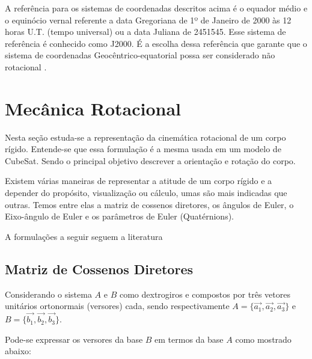 A referência para os sistemas de coordenadas descritos acima é o equador médio e o equinócio vernal referente a data Gregoriana de 1º de Janeiro de 2000 às 12 horas U.T. (tempo universal) ou a data Juliana de 2451545. Esse sistema de referência é conhecido como J2000. É a escolha dessa referência que garante que o sistema de coordenadas Geocêntrico-equatorial possa ser considerado não rotacional \cite{schutz2004statistical}.

\section{Mecânica Rotacional}\label{sec:3.1.2}

Nesta seção estuda-se a representação da cinemática rotacional de um corpo rígido. Entende-se que essa formulação é a mesma usada em um modelo de CubeSat. Sendo o principal objetivo descrever a orientação e rotação do corpo.

Existem várias maneiras de representar a atitude de um corpo rígido e a depender do propósito, visualização ou cálculo, umas são mais indicadas que outras. Temos entre elas a matriz de cossenos diretores, os ângulos de Euler, o Eixo-ângulo de Euler e os parâmetros de Euler (Quatérnions).

A formulações a seguir seguem a literatura \cite[p.~323-486]{wie2008space}

\subsection{Matriz de Cossenos Diretores}\label{sec:3.1.2.1}

Considerando o sistema \begin{math}A\end{math} e \begin{math}B\end{math} como dextrogiros e compostos por três vetores unitários ortonormais (versores) cada, sendo respectivamente \begin{math}A = \{\vec{a_1}, \vec{a_2}, \vec{a_3}\}\end{math} e \begin{math}B = \{\vec{b_1}, \vec{b_2}, \vec{b_3}\}\end{math}.

Pode-se expressar  os versores da base \begin{math}B\end{math} em termos da base \begin{math}A\end{math} como mostrado abaixo:

